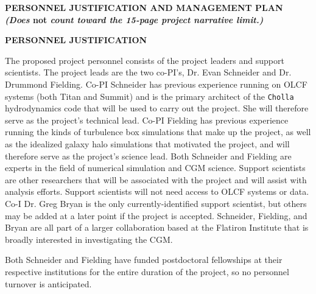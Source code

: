 \documentclass[11pt,letterpaper,english]{article}
\begin{document}
\setlength{\parindent}{0in} %


\pagestyle{fancy}   \renewcommand{%
\headrulewidth}{0.0pt}

\begin{center}
\bf {PERSONNEL JUSTIFICATION AND MANAGEMENT PLAN} \\
{\bf  {\em (Does} not {\em count toward the 15-page project narrative limit.)}}
\end{center}

\vspace{-.25in}
\begin{flushleft}
{\noindent \bf  {PERSONNEL JUSTIFICATION}}

The proposed project personnel consists of the project leaders and support scientists. The project leads are the two co-PI's, Dr. Evan Schneider and Dr. Drummond Fielding. Co-PI Schneider has previous experience running on OLCF systems (both Titan and Summit) and is the primary architect of the {\tt Cholla} hydrodynamics code that will be used to carry out the project. She will therefore serve as the project's technical lead. Co-PI Fielding has previous experience running the kinds of turbulence box simulations that make up the project, as well as the idealized galaxy halo simulations that motivated the project, and will therefore serve as the project's science lead. Both Schneider and Fielding are experts in the field of numerical simulation and CGM science. Support scientists are other researchers that will be associated with the project and will assist with analysis efforts. Support scientists will not need access to OLCF systems or data. Co-I Dr. Greg Bryan is the only currently-identified support scientist, but others may be added at a later point if the project is accepted. Schneider, Fielding, and Bryan are all part of a larger collaboration based at the Flatiron Institute that is broadly interested in investigating the CGM.

Both Schneider and Fielding have funded postdoctoral fellowships at their respective institutions for the entire duration of the project, so no personnel turnover is anticipated.


\end{flushleft}
\end{document}
